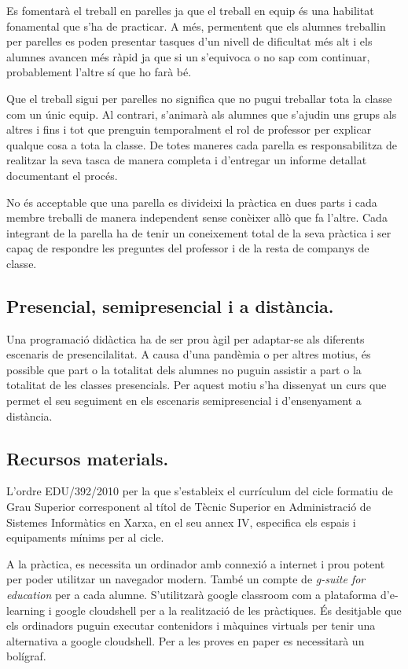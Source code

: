 \documentclass[catalan, a4paper, 12pt, titlepage]{article}
\begin{document}
Es fomentarà el treball en parelles ja que el treball en equip és una habilitat fonamental que s'ha de practicar.
A més, permentent que els alumnes treballin per parelles es poden presentar tasques d'un nivell de dificultat més alt i els alumnes avancen més ràpid ja que si un s'equivoca o no sap com continuar, probablement l'altre sí que ho farà bé.

Que el treball sigui per parelles no significa que no pugui treballar tota la classe com un únic equip.
Al contrari, s'animarà als alumnes que s'ajudin uns grups als altres i fins i tot que prenguin temporalment el rol de professor per explicar qualque cosa a tota la classe.
De totes maneres cada parella es responsabilitza de realitzar la seva tasca de manera completa i d'entregar un informe detallat documentant el procés.

No és acceptable que una parella es divideixi la pràctica en dues parts i cada membre treballi de manera independent sense conèixer allò que fa l'altre. 
Cada integrant de la parella ha de tenir un coneixement total de la seva pràctica i ser capaç de respondre les preguntes del professor i de la resta de companys de classe.

\subsection{Presencial, semipresencial i a distància.}

Una programació didàctica ha de ser prou àgil per adaptar-se als diferents escenaris de presencilalitat.
A causa d'una pandèmia o per altres motius, és possible que part o la totalitat dels alumnes no puguin assistir a part o la totalitat de les classes presencials.
Per aquest motiu s'ha dissenyat un curs que permet el seu seguiment en els escenaris semipresencial i d'ensenyament a distància.

\subsection{Recursos materials.}

L'ordre EDU/392/2010 per la que s'estableix el currículum del cicle formatiu de Grau Superior corresponent al títol de Tècnic Superior en Administració de Sistemes Informàtics en Xarxa, en el seu annex IV, especifica els espais i equipaments mínims per al cicle.

A la pràctica, es necessita un ordinador amb connexió a internet i prou potent per poder utilitzar un navegador modern. També un compte de \emph{g-suite for education} per a cada alumne. S'utilitzarà google classroom com a plataforma d'e-learning i google cloudshell per a la realització de les pràctiques. És desitjable que els ordinadors puguin executar contenidors i màquines virtuals per tenir una alternativa a google cloudshell. Per a les proves en paper es necessitarà un bolígraf.
\end{document}
